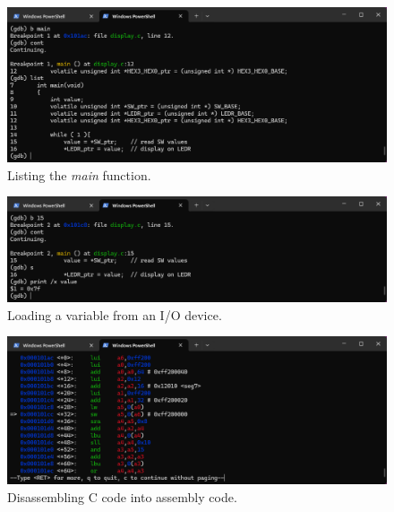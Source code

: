 \documentclass[11pt, twoside, pdftex]{article}
\begin{document}
\begin{figure}[h]
    \begin{center}
        \includegraphics[scale=.6]{figures/display_C1.png}
        \caption{Listing the {\it main} function.}
        \label{fig:display_C1}
    \end{center}
\end{figure}

\begin{figure}[H]
    \begin{center}
        \includegraphics[scale=.6]{figures/display_C2.png}
        \caption{Loading a variable from an I/O device.}
        \label{fig:display_C2}
    \end{center}
\end{figure}

\begin{figure}[H]
    \begin{center}
        \includegraphics[scale=.6]{figures/display_C3.png}
        \caption{Disassembling C code into assembly code.}
        \label{fig:display_C3}
    \end{center}
\end{figure}
\end{document}
